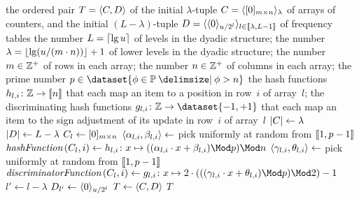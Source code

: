 \begin{algorithmic}[1]
  \Out the ordered pair \( T = \langle C, D\rangle \) of the initial \( \lambda \)-tuple \( C = \langle\lbrack0\rbrack_{m \times n}\rangle_{\lambda} \) of arrays of counters, and the initial \( (L - \lambda) \)-tuple \( D = \langle\langle0\rangle_{u / 2^{l}}\rangle_{l \in \llbracket\lambda, L - 1\rrbracket} \) of frequency tables
  \Constant the number \( L = \lceil\lg u\rceil \) of levels in the dyadic structure; the number \( \lambda = \lfloor\lg (u / (m \cdot n))\rfloor + 1 \) of lower levels in the dyadic structure; the number \( m \in \mathbb{Z}^{+} \) of rows in each array; the number \( n \in \mathbb{Z}^{+} \) of columns in each array; the prime number \( p \in \dataset{\phi \in \primes \suchthat \phi > n} \)
  \Local the hash functions \( h_{l, i} \colon \mathbb{Z} \to \llbracket n\rrbracket \) that each map an item to a position in row~\( i \) of array~\( l \); the discriminating hash functions \( g_{l, i} \colon \integers \to \dataset{-1, +1} \) that each map an item to the sign adjustment of its update in row~\( i \) of array~\( l \)
    \State \( \lvert C\rvert \gets \lambda \)
    \State \( \lvert D\rvert \gets L - \lambda \)
        \State \( C_{l} \gets \lbrack0\rbrack_{m \times n} \)
          \State \( \langle\alpha_{l, i}, \beta_{l, i}\rangle \gets \) pick uniformly at random from \( \llbracket1, p - 1\rrbracket \)
          \State \( \hashFunction (C_{l}, i) \gets h_{l, i} \colon x \mapsto ((\alpha_{l, i} \cdot x + \beta_{l, i}) \Mod p) \Mod n \)
          \State \( \langle\gamma_{l, i}, \theta_{l, i}\rangle \gets \) pick uniformly at random from \( \llbracket1, p - 1\rrbracket \)
          \State \( \discriminatorFunction (C_{l}, i) \gets g_{l, i} \colon x \mapsto 2 \cdot (((\gamma_{l, i} \cdot x + \theta_{l, i}) \Mod p) \Mod 2) - 1 \)
        \EndFor
      \Else
        \State \( l' \gets l - \lambda \)
        \State \( D_{l'} \gets \langle0\rangle_{u / 2^{l}} \)
      \EndIf
    \EndFor
    \State \( T \gets \langle C, D\rangle \)
    \State \Return \( T \)
  \EndFunction
\end{algorithmic}

